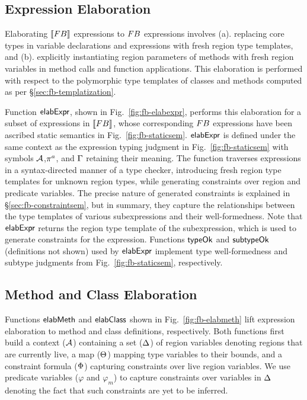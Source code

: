 


\subsection{Expression Elaboration}

Elaborating $\llbracket {\sc FB} \rrbracket$ expressions to ${\sc FB}$ expressions involves
(a). replacing core types in variable declarations and 
expressions with fresh region type templates, and (b). explicitly
instantiating region parameters of methods with fresh region variables
in method calls and function applications. This elaboration is
performed with respect to the polymorphic type templates of classes
and methods computed as per \S\ref{sec:fb-templatization}. 

Function ${\sf elabExpr}$, shown in Fig.~\ref{fig:fb-elabexpr}, performs
this elaboration for a subset of expressions in $\llbracket {\sc FB} \rrbracket$, whose
corresponding ${\sc FB}$ expressions have been ascribed static semantics in
Fig.~\ref{fig:fb-staticsem}. ${\sf elabExpr}$ is defined under the same
context as the expression typing judgment in
Fig.~\ref{fig:fb-staticsem} with symbols ${\mathcal{A}}$,$\pi^a$, and $\Gamma$
retaining their meaning. The function traverses expressions in a
syntax-directed manner of a type checker, introducing fresh region
type templates for unknown region types, while generating constraints
over region and predicate variables. The precise nature of generated
constraints is explained in \S\ref{sec:fb-constraintsem}, but in
summary, they capture the relationships between the type templates of
various subexpressions and their well-formedness. Note that
${\sf elabExpr}$ returns the region type template of the subexpression,
which is used to generate constraints for the expression. Functions
${\sf typeOk}$ and ${\sf subtypeOk}$ (definitions not shown) used by ${\sf elabExpr}$
implement type well-formedness and subtype judgments from
Fig.~\ref{fig:fb-staticsem}, respectively.

\subsection{Method and Class Elaboration}

Functions ${\sf elabMeth}$ and ${\sf elabClass}$ shown in
Fig.~\ref{fig:fb-elabmeth} lift expression elaboration to method and
class definitions, respectively. Both functions first build a context
(${\mathcal{A}}$) containing a set ($ \Delta$) of region variables denoting
regions that are currently live, a map ($\Theta$) mapping type
variables to their bounds, and a constraint formula ($\Phi$)
capturing constraints over live region variables. We use predicate
variables ($\varphi$ and $\varphi_m$) to capture constraints over
variables in $\Delta$ denoting the fact that such constraints are yet
to be inferred.

